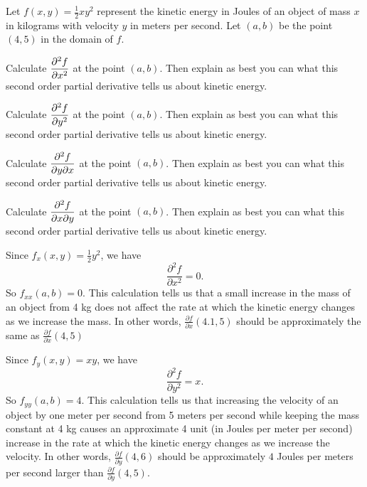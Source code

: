 \begin{exercises}
\item Let $f(x,y) = \frac{1}{2}xy^2$ represent the kinetic energy in Joules of an object of mass $x$ in
kilograms with velocity $y$ in meters per second. Let $(a,b)$ be the point $(4,5)$ in the domain of $f$.
	\ba
	\item Calculate $\displaystyle \frac{ \partial^2 f}{\partial x^2}$ at the point $(a,b)$. Then explain as best you can what this second order partial
derivative tells us about kinetic energy. %

	\item Calculate $\displaystyle \frac{ \partial^2 f}{\partial y^2}$ at the point $(a,b)$. Then explain as best you can what this second order partial
derivative tells us about kinetic energy.

	\item Calculate $\displaystyle \frac{ \partial^2 f}{\partial y \partial x}$ at the point $(a,b)$. Then explain as best you can what this second order
partial derivative tells us about kinetic energy.

	\item Calculate $\displaystyle \frac{ \partial^2 f}{\partial x \partial y}$ at the point $(a,b)$. Then explain as best you can what this second order
partial derivative tells us about kinetic energy.

	\ea

\begin{exerciseSolution}
\ba
\item Since $f_x(x,y) = \frac{1}{2}y^2$, we have 
\[\frac{ \partial^2 f}{\partial x^2}  = 0.\]
So $f_{xx}(a,b) = 0$.  This calculation tells us that a small increase in the mass of an object from 4 kg does not affect the rate at which the kinetic energy changes as we increase the mass. In other words, $\frac{\partial f}{\partial x}(4.1,5)$ should be approximately the same as $\frac{\partial f}{\partial x}(4,5)$ 

\item Since $f_y(x,y) = xy$, we have 
\[\frac{ \partial^2 f}{\partial y^2}  = x.\]
So $f_{yy}(a,b) = 4$.  This calculation tells us that increasing the velocity of an object by one meter per second from 5 meters per second while keeping the mass constant at 4 kg causes an approximate 4 unit (in Joules per meter per second) increase in the rate at which the kinetic energy changes as we increase the velocity. In other words, $\frac{\partial f}{\partial y}(4,6)$ should be approximately $4$ Joules per meters per second larger than $\frac{\partial f}{\partial y}(4,5)$.  


\end{exerciseSolution}
\end{exercises}
